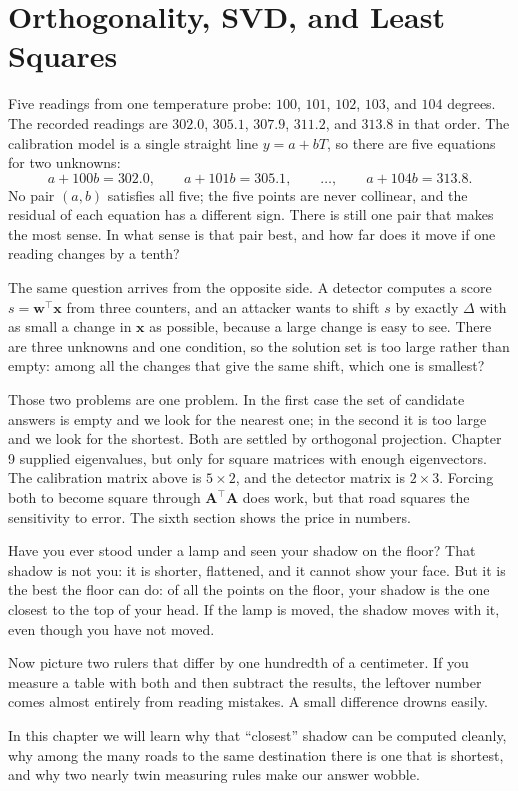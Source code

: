 \chapter{Orthogonality, SVD, and Least Squares}

Five readings from one temperature probe: $100$, $101$, $102$, $103$, and $104$ degrees.
The recorded readings are $302.0$, $305.1$, $307.9$, $311.2$, and
$313.8$ in that order. The calibration model is a single straight line $y=a+bT$, so there
are five equations for two unknowns:
\[
  a+100b=302.0,\qquad a+101b=305.1,\qquad \dots,\qquad a+104b=313.8 .
\]
No pair $(a,b)$ satisfies all five; the five points are never
collinear, and the residual of each equation has a different sign. There is still one pair that
makes the most sense. In what sense is that pair best, and how far does it
move if one reading changes by a tenth?

The same question arrives from the opposite side. A detector computes a score
$s=\mathbf{w}^{\top}\mathbf{x}$ from three counters, and an attacker wants to shift $s$
by exactly $\Delta$ with as small a change in $\mathbf{x}$ as possible, because a large change
is easy to see. There are three unknowns and one condition, so the solution set is too large
rather than empty: among all the changes that give the same shift, which one is smallest?

Those two problems are one problem. In the first case the set of candidate answers is empty and
we look for the nearest one; in the second it is too large and we look for the
shortest. Both are settled by orthogonal projection. Chapter 9 supplied eigenvalues, but
only for square matrices with enough eigenvectors.
The calibration matrix above is $5\times2$, and the detector matrix is $2\times3$.
Forcing both to become square through $\mathbf{A}^{\top}\mathbf{A}$ does work,
but that road squares the sensitivity to error. The sixth section shows the
price in numbers.

\begin{untukanak}
Have you ever stood under a lamp and seen your shadow on the floor? That shadow is
not you: it is shorter, flattened, and it cannot show your face. But it is the best
the floor can do: of all the points on the floor, your shadow is the one
closest to the top of your head. If the lamp is moved, the shadow moves with it, even though you
have not moved.

Now picture two rulers that differ by one hundredth of a centimeter. If you
measure a table with both and then subtract the results, the leftover number comes almost
entirely from reading mistakes. A small difference drowns easily.

In this chapter we will learn why that ``closest'' shadow can be computed
cleanly, why among the many roads to the same destination there is one that is shortest, and
why two nearly twin measuring rules make our answer wobble.
\end{untukanak}

